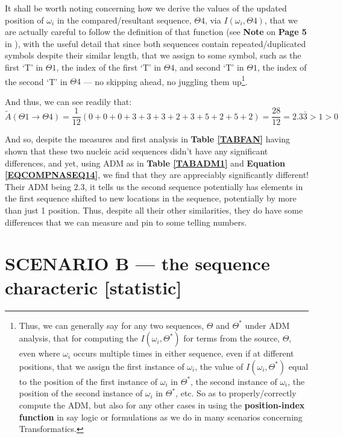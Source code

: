 \documentclass[a4paper, 18pt]{book} %
\begin{document}
It shall be worth noting concerning how we derive the values of the updated position of $\omega_i$ in the compared/resultant sequence, $\Theta4$, via $I(\omega_i,\Theta4)$, that we are actually careful to follow the definition of that function (see \textbf{Note} on \textbf{Page 5} in \cite{transformatics}), with the useful detail that since both sequences contain repeated/duplicated symbols despite their similar length, that we assign to some symbol, such as the first `T' in $\Theta1$, the index of the first `T' in $\Theta4$, and second `T' in $\Theta1$, the index of the second `T' in $\Theta4$ --- no skipping ahead, no juggling them up\footnote{Thus, we can generally say for any two sequences, $\Theta$ and $\Theta^*$ under ADM analysis, that for computing the $I(\omega_i,\Theta^*)$ for terms from the source, $\Theta$, even where $\omega_i$ occurs multiple times in either sequence, even if at different positions, that we assign the first instance of $\omega_i$, the value of $I(\omega_i,\Theta^*)$ equal to the position of the first instance of $\omega_i$ in $\Theta^*$, the second instance of $\omega_i$, the position of the second instance of $\omega_i$ in $\Theta^*$, etc. So as to properly/correctly compute the ADM, but also for any other cases in using the \textbf{position-index function} in say logic or formulations as we do in many scenarios concerning Transformatics.}.

And thus, we can see readily that:\\

\begin{equation}
\label{EQCOMPNASEQ14}
\tilde{A}(\Theta1 \rightarrow \Theta4) = \frac{1}{12}(0 + 0 + 0 + 3 + 3 + 3 + 2 + 3 + 5 + 2 + 5 + 2) = \frac{28}{12} = 2.3\bar{3} > 1 > 0
\end{equation}

And so, despite the measures and first analysis in \textbf{Table \ref{TABFAN}} having shown that these two nucleic acid sequences didn't have any significant differences, and yet, using ADM as in \textbf{Table \ref{TABADM1}} and \textbf{Equation \ref{EQCOMPNASEQ14}}, we find that they are appreciably significantly different! Their ADM being $2.3$, it tells us the second sequence potentially has elements in the first sequence shifted to new locations in the sequence, potentially by more than just 1 position. Thus, despite all their other similarities, they do have some differences that we can measure and pin to some telling numbers.

\section{SCENARIO B --- the sequence characteric [statistic]}
\label{SECSCENB}
\end{document}
